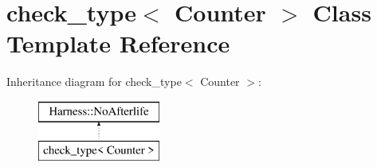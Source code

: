 \hypertarget{classcheck__type}{}\section{check\+\_\+type$<$ Counter $>$ Class Template Reference}
\label{classcheck__type}
Inheritance diagram for check\+\_\+type$<$ Counter $>$\+:\begin{figure}[H]
\begin{center}
\leavevmode
\includegraphics[height=2.000000cm]{classcheck__type}
\end{center}
\end{figure}
